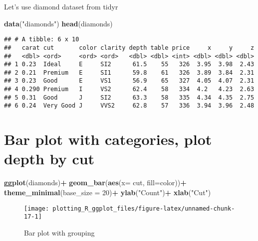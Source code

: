 \documentclass[
]{book}
\newenvironment{Shaded}{\begin{snugshade}}{\end{snugshade}}
\newcommand{\DataTypeTok}[1]{\textcolor[rgb]{0.13,0.29,0.53}{#1}}
\newcommand{\DecValTok}[1]{\textcolor[rgb]{0.00,0.00,0.81}{#1}}
\newcommand{\KeywordTok}[1]{\textcolor[rgb]{0.13,0.29,0.53}{\textbf{#1}}}
\newcommand{\NormalTok}[1]{#1}
\newcommand{\OperatorTok}[1]{\textcolor[rgb]{0.81,0.36,0.00}{\textbf{#1}}}
\newcommand{\StringTok}[1]{\textcolor[rgb]{0.31,0.60,0.02}{#1}}
\begin{document}
Let's use diamond dataset from tidyr

\begin{Shaded}
\begin{Highlighting}[]
\KeywordTok{data}\NormalTok{(}\StringTok{"diamonds"}\NormalTok{)}
\KeywordTok{head}\NormalTok{(diamonds)}
\end{Highlighting}
\end{Shaded}

\begin{verbatim}
## # A tibble: 6 x 10
##   carat cut       color clarity depth table price     x     y     z
##   <dbl> <ord>     <ord> <ord>   <dbl> <dbl> <int> <dbl> <dbl> <dbl>
## 1 0.23  Ideal     E     SI2      61.5    55   326  3.95  3.98  2.43
## 2 0.21  Premium   E     SI1      59.8    61   326  3.89  3.84  2.31
## 3 0.23  Good      E     VS1      56.9    65   327  4.05  4.07  2.31
## 4 0.290 Premium   I     VS2      62.4    58   334  4.2   4.23  2.63
## 5 0.31  Good      J     SI2      63.3    58   335  4.34  4.35  2.75
## 6 0.24  Very Good J     VVS2     62.8    57   336  3.94  3.96  2.48
\end{verbatim}

\hypertarget{bar-plot-with-categories-plot-depth-by-cut}{%
\section{Bar plot with categories, plot depth by cut}\label{bar-plot-with-categories-plot-depth-by-cut}}

\begin{Shaded}
\begin{Highlighting}[]
\KeywordTok{ggplot}\NormalTok{(diamonds)}\OperatorTok{+}
\StringTok{ }\KeywordTok{geom_bar}\NormalTok{(}\KeywordTok{aes}\NormalTok{(}\DataTypeTok{x=}\NormalTok{ cut, }\DataTypeTok{fill=}\NormalTok{color))}\OperatorTok{+}
\StringTok{  }\KeywordTok{theme_minimal}\NormalTok{(}\DataTypeTok{base_size =} \DecValTok{20}\NormalTok{)}\OperatorTok{+}
\StringTok{  }\KeywordTok{ylab}\NormalTok{(}\StringTok{"Count"}\NormalTok{)}\OperatorTok{+}\StringTok{ }\KeywordTok{xlab}\NormalTok{(}\StringTok{"Cut"}\NormalTok{)}
\end{Highlighting}
\end{Shaded}

\begin{figure}

{\centering \texttt{[image: plotting\_R\_ggplot\_files/figure-latex/unnamed-chunk-17-1]} 

}

\caption{Bar plot with grouping}\label{fig:unnamed-chunk-17}
\end{figure}
\end{document}
